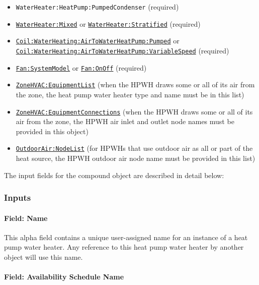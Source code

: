 \begin{itemize}
\item
  \lstinline!WaterHeater:HeatPump:PumpedCondenser! (required)
\item
   \hyperref[waterheatermixed]{\lstinline!WaterHeater:Mixed!} or \hyperref[waterheaterstratified]{\lstinline!WaterHeater:Stratified!} (required)
\item
  \hyperref[coilwaterheatingairtowaterheatpumppumped]{\lstinline!Coil:WaterHeating:AirToWaterHeatPump:Pumped!} or \hyperref[coil-waterheating-airtowaterheatpump-variablespeed]{\lstinline!Coil:WaterHeating:AirToWaterHeatPump:VariableSpeed!} (required)
\item
  \hyperref[fansystemmodel]{\lstinline!Fan:SystemModel!} or \hyperref[fanonoff]{\lstinline!Fan:OnOff!} (required)
\item
  \hyperref[zonehvacequipmentlist]{\lstinline!ZoneHVAC:EquipmentList!} (when the HPWH draws some or all of its air from the zone, the heat pump water heater type and name must be in this list)
\item
  \hyperref[zonehvacequipmentconnections]{\lstinline!ZoneHVAC:EquipmentConnections!} (when the HPWH draws some or all of its air from the zone, the HPWH air inlet and outlet node names must be provided in this object)
\item
  \hyperref[outdoorairnodelist]{\lstinline!OutdoorAir:NodeList!} (for HPWHs that use outdoor air as all or part of the heat source, the HPWH outdoor air node name must be provided in this list)
\end{itemize}

The input fields for the compound object are described in detail below:

\subsubsection{Inputs}\label{inputs-3-040}

\paragraph{Field: Name}\label{field-name-2-042}

This alpha field contains a unique user-assigned name for an instance of a heat pump water heater. Any reference to this heat pump water heater by another object will use this name.

\paragraph{Field: Availability Schedule Name}\label{field-availability-schedule-name-019}

